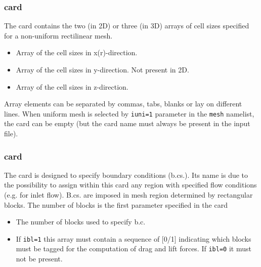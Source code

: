 \subsubsection{ card}

The  card contains the two (in 2D) or three (in 3D) arrays of cell 
sizes specified for a non-uniform rectilinear mesh. 

\begin{itemize}
\item
{}
{Array of the cell sizes in x(r)-direction.}

\item
{}
{Array of the cell sizes in y-direction.
Not present in 2D.}

\item
{}
{Array of the cell sizes in z-direction.}
\end{itemize}

Array elements can be separated by commas, tabs, blanks or lay on different
lines.  When uniform mesh is selected by {\tt iuni=1} parameter in the 
{\tt mesh} namelist, the card can be empty (but the card 
name must always be present in the input file).

\subsubsection{ card}

The  card is designed to specify boundary conditions (b.cs.).
Its name is due to the possibility to assign within this card any region with
specified flow conditions (e.g. for inlet flow). B.cs. are imposed in 
mesh region determined by rectangular blocks. The number of blocks is the
first parameter specified in the card

\begin{itemize}
\item
{}
{The number of blocks used to specify b.c.}
\item
{}
{If {\tt ibl=1} this array must contain a sequence of [0/1] indicating which
blocks must be tagged for the computation of drag and lift forces. If
{\tt ibl=0} it must not be present.}
\end{itemize}

